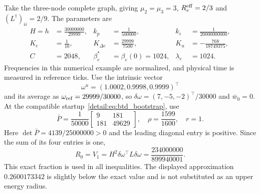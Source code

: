 Take the three-node complete graph, giving
$\mu_2=\mu_3=3$, $R_e^{\rm eff}=2/3$ and
$(L^\dagger)_{ii}=2/9$. The parameters are
\begin{align}
 H=h&=\frac{30000000}{29999},&k_p&=\frac1{500000},&k_i&=\frac1{20000000000},\nonumber\\
 K_e&=\frac1{10},&K_{\Delta e}&=\frac{29999}{7500},&K_u&=-\frac{768}{18749375},\nonumber\\
 C&=2048,&\beta^*_e&=\beta_e(0)=1024,&\lambda_e&=1024.
 \label{detail:eq:btd_example_gains}
\end{align}
Frequencies in this numerical example are normalized, and physical time is measured in reference ticks. Use the intrinsic vector
\[
 \omega^u=(1.0002,0.9998,0.9999)^\top
\]
and its average as
$\omega_{\rm ref}=29999/30000$, so
$\delta\omega=(7,-5,-2)^\top/30000$ and $\bar w_0=0$.
At the compatible startup~\eqref{detail:eq:btd_bootstrap}, use
\begin{equation}
 \bar P=\frac1{50000}\begin{bmatrix}9&181\\181&49629\end{bmatrix},
 \quad\rho=\frac{1599}{1600},\quad r=1.
 \label{detail:eq:btd_witness}
\end{equation}
Here $\det\bar P=4139/25000000>0$ and the leading diagonal entry is
positive. Since the sum of its four entries is one,
\begin{equation}
 R_0=V_1=H^2\delta\omega^\top L\delta\omega
     =\frac{234000000}{899940001}.
 \label{detail:eq:btd_d_R0}
\end{equation}
This exact fraction is used in all inequalities. The displayed approximation
$0.2600173342$ is slightly below the exact value and is not substituted as
an upper energy radius.

